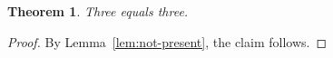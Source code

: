 \newtheorem{theorem}{Theorem}

\begin{theorem}\label{thm:missing-reference-target}
Three equals three.
\end{theorem}
\begin{proof}
By Lemma~\ref{lem:not-present}, the claim follows.
\end{proof}
